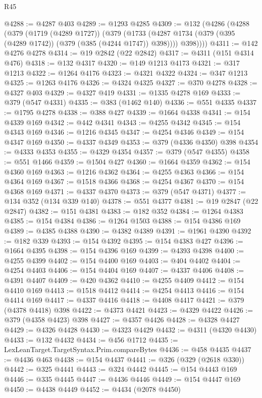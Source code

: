 \begin{lexlean}{R45}
\begin{coremodule}
@4288 := @4287 @403
@4289 := @1293 @4285
@4309 := @132
    (@4286
      (@4288
        (@379
          (@1719 (@4289 @1727))
          (@379
            (@1733 (@4287 @1734 (@379 (@395 (@4289 @1742)) (@379 (@385 (@4244 @1747)) @398))))
            @398))))
@4311 := @142 @4276 @4278
@4314 := @19 @2842 (@22 @2842)
@4317 := @4311 (@151 @4314 @476)
@4318 := @132 @4317
@4320 := @149 @1213 @4173
@4321 := @317 @1213
@4322 := @1264 @4176
@4323 := @4321 @4322
@4324 := @347 @1213
@4325 := @1263 @4176
@4326 := @4324 @4325
@4327 := @370 @4278
@4328 := @4327 @403
@4329 := @4327 @419
@4331 := @1335 @4278 @169
@4333 := @379 (@547 @4331)
@4335 := @383 (@1462 @140)
@4336 := @551 @4335
@4337 := @1795 @4278
@4338 := @388 @427
@4339 := @1664 @4338
@4341 := @154 @4339 @169
@4342 := @442 @4341
@4343 := @4255 @4342
@4345 := @154 @4343 @169
@4346 := @1216 @4345
@4347 := @4254 @4346
@4349 := @154 @4347 @169
@4350 := @4337 @4349
@4353 := @379 (@4336 @4350) @398
@4354 := @4333 @4353
@4355 := @4329 @4354
@4357 := @379 (@547 @4355)
@4358 := @551 @1466
@4359 := @1504 @427
@4360 := @1664 @4359
@4362 := @154 @4360 @169
@4363 := @1216 @4362
@4364 := @4255 @4363
@4366 := @154 @4364 @169
@4367 := @1518 @4366
@4368 := @4254 @4367
@4370 := @154 @4368 @169
@4371 := @4337 @4370
@4373 := @379 (@547 @4371)
@4377 := @134 @352 (@134 @339 @140)
@4378 := @551 @4377
@4381 := @19 @2847 (@22 @2847)
@4382 := @151 @4381
@4383 := @182 @352
@4384 := @1264 @4383
@4385 := @154 @4384
@4386 := @1264 @1503
@4388 := @154 @4386 @169
@4389 := @4385 @4388
@4390 := @4382 @4389
@4391 := @1961 @4390
@4392 := @182 @339
@4393 := @154 @4392
@4395 := @154 @4383 @427
@4396 := @1664 @4395
@4398 := @154 @4396 @169
@4399 := @4393 @4398
@4400 := @4255 @4399
@4402 := @154 @4400 @169
@4403 := @404 @4402
@4404 := @4254 @4403
@4406 := @154 @4404 @169
@4407 := @4337 @4406
@4408 := @4391 @4407
@4409 := @420 @4362
@4410 := @4255 @4409
@4412 := @154 @4410 @169
@4413 := @1518 @4412
@4414 := @4254 @4413
@4416 := @154 @4414 @169
@4417 := @4337 @4416
@4418 := @4408 @4417
@4421 := @379 (@4378 @4418) @398
@4422 := @4373 @4421
@4423 := @4329 @4422
@4426 := @379 (@4358 @4423) @398
@4427 := @4357 @4426
@4428 := @4328 @4427
@4429 := @4326 @4428
@4430 := @4323 @4429
@4432 := @4311 (@4320 @4430)
@4433 := @132 @4432
@4434 := @456 @1712
@4435 := LexLeanTarget.TargetSyntax.Prim.compareBytes
@4436 := @458 @4435
@4437 := @4436 @463
@4438 := @154 @4437
@4441 := @326 (@329 (@2618 @330))
@4442 := @325 @4441
@4443 := @324 @4442
@4445 := @154 @4443 @169
@4446 := @335 @4445
@4447 := @4436 @4446
@4449 := @154 @4447 @169
@4450 := @4438 @4449
@4452 := @4434 (@2078 @4450)

\end{coremodule}
\end{lexlean}

